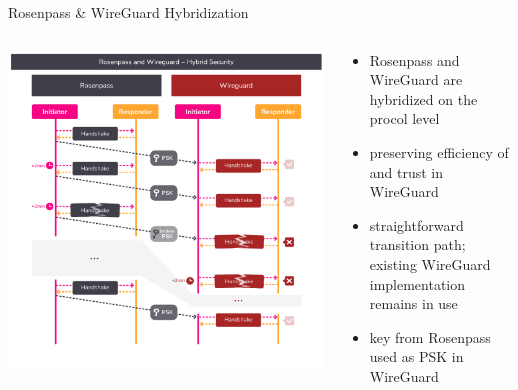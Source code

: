 \begin{frame}{Rosenpass \& WireGuard Hybridization}
  \begin{columns}[c]
    \begin{column}{.5\linewidth}
      \includegraphics[width=\linewidth, clip=true,trim=42 41 42 42]{graphics/rosenpass-wireguard-hybrid-security.pdf}
    \end{column}
    \begin{column}{.45\linewidth}
      \small
      \begin{itemize}
        \item Rosenpass and WireGuard are hybridized on the procol level
        \item preserving efficiency of and trust in WireGuard
        \item straightforward transition path; existing WireGuard implementation remains in use
        \item key from Rosenpass used as PSK in WireGuard
      \end{itemize}
    \end{column}

  \end{columns}
\end{frame}
